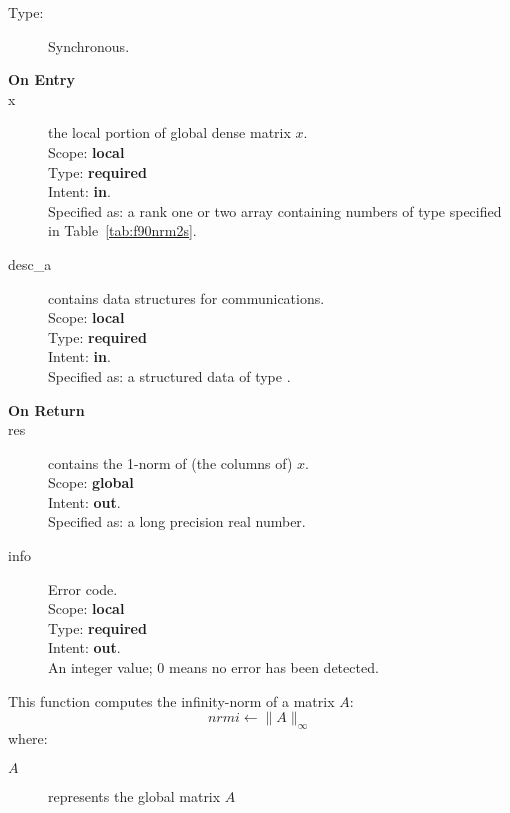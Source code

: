 \begin{description}
\item[Type:] Synchronous.
\item[\bf On Entry]
\item[x] the local portion of global dense matrix
$x$. %
\\
Scope: {\bf local} \\
Type: {\bf required} \\
Intent: {\bf in}.\\
Specified as: a rank one or two array 
containing numbers of type specified in
Table~\ref{tab:f90nrm2s}.
\item[desc\_a] contains data structures for communications.\\
Scope: {\bf local} \\
Type: {\bf required}\\
Intent: {\bf in}.\\
Specified as: a structured data of type \descdata.

\item[\bf On Return] 
\item[res] contains the 1-norm of (the columns of) $x$.\\
Scope: {\bf global} \\
Intent: {\bf out}.\\
Specified as: a long precision real  number.
\item[info] Error code.\\
Scope: {\bf local} \\
Type: {\bf required} \\
Intent: {\bf out}.\\
An integer value; 0 means no error has been detected. 
\end{description}



%
%



This function computes the infinity-norm of a matrix $A$:\\

\[ nrmi \leftarrow \|A\|_\infty \]
where:
\begin{description}
\item[$A$] represents the global matrix $A$
\end{description}

